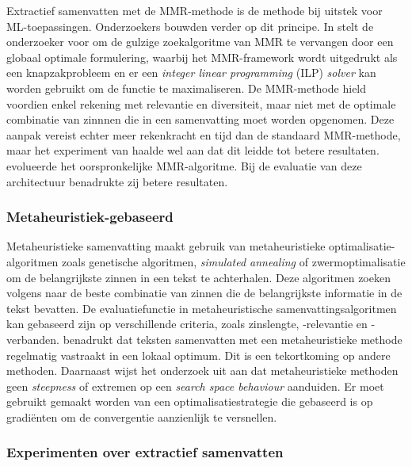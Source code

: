 Extractief samenvatten met de MMR-methode is de methode bij uitstek voor ML-toepassingen. Onderzoekers bouwden verder op dit principe. In \textcite{McDonald2007} stelt de onderzoeker voor om de gulzige zoekalgoritme van MMR te vervangen door een globaal optimale formulering, waarbij het MMR-framework wordt uitgedrukt als een knapzakprobleem en er een \textit{integer linear programming} (ILP) \textit{solver} kan worden gebruikt om de functie te maximaliseren. De MMR-methode hield voordien enkel rekening met relevantie en diversiteit, maar niet met de optimale combinatie van zinnnen die in een samenvatting moet worden opgenomen. Deze aanpak vereist echter meer rekenkracht en tijd dan de standaard MMR-methode, maar het experiment van \textcite{McDonald2007} haalde wel aan dat dit leidde tot betere resultaten. \textcite{Lin2010} evolueerde het oorspronkelijke MMR-algoritme. Bij de evaluatie van deze architectuur benadrukte zij betere resultaten. 

\subsubsection{Metaheuristiek-gebaseerd}

Metaheuristieke samenvatting maakt gebruik van metaheuristieke optimalisatie-algoritmen zoals genetische algoritmen, \textit{simulated annealing} of zwermoptimalisatie om de belangrijkste zinnen in een tekst te achterhalen. Deze algoritmen zoeken volgens \textcite{Verma2020, Premjith2015} naar de beste combinatie van zinnen die de belangrijkste informatie in de tekst bevatten. De evaluatiefunctie in metaheuristische samenvattingsalgoritmen kan gebaseerd zijn op verschillende criteria, zoals zinslengte, -relevantie en -verbanden. \textcite{Rani2021} benadrukt dat teksten samenvatten met een metaheuristieke methode regelmatig vastraakt in een lokaal optimum. Dit is een tekortkoming op andere methoden. Daarnaast wijst het onderzoek uit aan dat metaheuristieke methoden geen \textit{steepness} of extremen op een \textit{search space behaviour} aanduiden. Er moet gebruikt gemaakt worden van een optimalisatiestrategie die gebaseerd is op gradiënten om de convergentie aanzienlijk te versnellen.


\subsubsection{Experimenten over extractief samenvatten}

